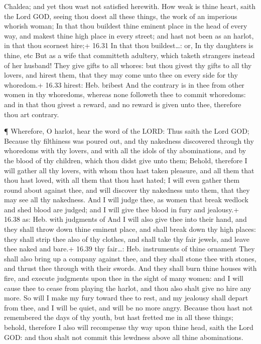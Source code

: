 Chaldea; and yet thou wast not satisfied herewith.  How
weak is thine heart, saith the Lord GOD, seeing thou doest all these
things, the work of an imperious whorish woman;  In that
thou buildest thine eminent place in the head of every way, and makest
thine high place in every street; and hast not been as an harlot, in
that thou scornest hire;+ 16.31 In that thou buildest\ldots: or, In thy
daughters is thine, etc  But as a wife that committeth
adultery, which taketh strangers instead of her husband! 
They give gifts to all whores: but thou givest thy gifts to all thy
lovers, and hirest them, that they may come unto thee on every side for
thy whoredom.+ 16.33 hirest: Heb. bribest  And the contrary
is in thee from other women in thy whoredoms, whereas none followeth
thee to commit whoredoms: and in that thou givest a reward, and no
reward is given unto thee, therefore thou art contrary.

 ¶ Wherefore, O harlot, hear the word of the LORD:
 Thus saith the Lord GOD; Because thy filthiness was poured
out, and thy nakedness discovered through thy whoredoms with thy lovers,
and with all the idols of thy abominations, and by the blood of thy
children, which thou didst give unto them;  Behold,
therefore I will gather all thy lovers, with whom thou hast taken
pleasure, and all them that thou hast loved, with all them that thou
hast hated; I will even gather them round about against thee, and will
discover thy nakedness unto them, that they may see all thy nakedness.
 And I will judge thee, as women that break wedlock and
shed blood are judged; and I will give thee blood in fury and jealousy.+
16.38 as: Heb. with judgments of  And I will also give thee
into their hand, and they shall throw down thine eminent place, and
shall break down thy high places: they shall strip thee also of thy
clothes, and shall take thy fair jewels, and leave thee naked and bare.+
16.39 thy fair\ldots: Heb. instruments of thine ornament 
They shall also bring up a company against thee, and they shall stone
thee with stones, and thrust thee through with their swords.
 And they shall burn thine houses with fire, and execute
judgments upon thee in the sight of many women: and I will cause thee to
cease from playing the harlot, and thou also shalt give no hire any
more.  So will I make my fury toward thee to rest, and my
jealousy shall depart from thee, and I will be quiet, and will be no
more angry.  Because thou hast not remembered the days of
thy youth, but hast fretted me in all these things; behold, therefore I
also will recompense thy way upon thine head, saith the Lord GOD: and
thou shalt not commit this lewdness above all thine abominations.

